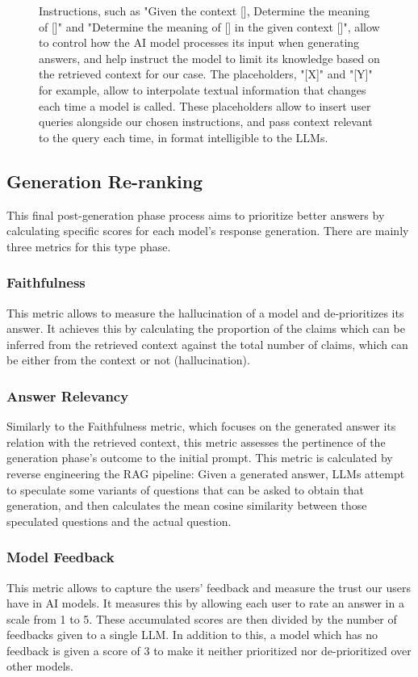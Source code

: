 \begin{figure}[H]
\begin{flushleft}
        Instructions, such as "Given the context [], Determine the meaning of []" and "Determine the meaning of [] in the given context []", allow to control how the AI model processes its input when generating answers, and help instruct the model to limit its knowledge based on the retrieved context for our case.\newline
        The placeholders, "[X]" and "[Y]" for example, allow to interpolate textual information that changes each time a model is called. These placeholders allow to insert user queries alongside our chosen instructions, and pass context relevant to the query each time, in format intelligible to the LLMs.
    \end{flushleft}
\end{figure}
\subsection{Generation Re-ranking}
This final post-generation phase process aims to prioritize better answers by calculating specific scores for each model's response generation. There are mainly three metrics for this type phase.
\subsubsection{Faithfulness}
This metric allows to measure the hallucination of a model and de-prioritizes its answer. It achieves this by calculating the proportion of the claims which can be inferred from the retrieved context against the total number of claims, which can be either from the context or not (hallucination).
\subsubsection{Answer Relevancy}
Similarly to the Faithfulness metric, which focuses on the generated answer its relation with the retrieved context, this metric assesses the pertinence of the generation phase's outcome to the initial prompt. This metric is calculated by reverse engineering the RAG pipeline: Given a generated answer, LLMs attempt to speculate some variants of questions that can be asked to obtain that generation, and then calculates the mean cosine similarity between those speculated questions and the actual question.
\subsubsection{Model Feedback}
This metric allows to capture the users' feedback and measure the trust our users have in AI models. It measures this by allowing each user to rate an answer in a scale from 1 to 5. These accumulated scores are then divided by the number of feedbacks given to a single LLM. In addition to this, a model which has no feedback is given a score of 3 to make it neither prioritized nor de-prioritized  over other models.

